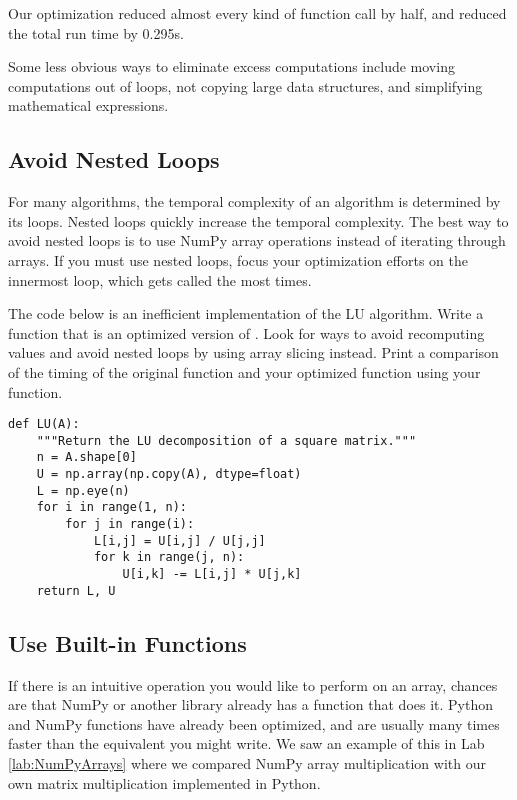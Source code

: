 Our optimization reduced almost every kind of function call by half, and reduced the total run time by 0.295s.

Some less obvious ways to eliminate excess computations include moving computations out of loops, not copying large data structures, and simplifying mathematical expressions.

\subsection*{Avoid Nested Loops} %

For many algorithms, the temporal complexity of an algorithm is determined by its loops.
Nested loops quickly increase the temporal complexity.
The best way to avoid nested loops is to use NumPy array operations instead of iterating through arrays.
If you must use nested loops, focus your optimization efforts on the innermost loop, which gets called the most times.

\begin{problem}
The code below is an inefficient implementation of the LU algorithm.
Write a function  that is an optimized version of .
Look for ways to avoid recomputing values and avoid nested loops by using array slicing instead.
Print a comparison of the timing of the original function and your optimized function using your  function.

\begin{lstlisting}
def LU(A):
    """Return the LU decomposition of a square matrix."""
    n = A.shape[0]
    U = np.array(np.copy(A), dtype=float)
    L = np.eye(n)
    for i in range(1, n):
        for j in range(i):
            L[i,j] = U[i,j] / U[j,j]
            for k in range(j, n):
                U[i,k] -= L[i,j] * U[j,k]
    return L, U
\end{lstlisting}
\end{problem}

\subsection*{Use Built-in Functions} %

If there is an intuitive operation you would like to perform on an array, chances are that NumPy or another library already has a function that does it.
Python and NumPy functions have already been optimized, and are usually many times faster than the equivalent you might write.
We saw an example of this in Lab \ref{lab:NumPyArrays} where we compared NumPy array multiplication with our own matrix multiplication implemented in Python.

